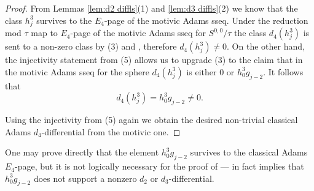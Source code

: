 \begin{proof}
  From Lemmas \ref{lem:d2 diffls}(1) and \ref{lem:d3 diffls}(2) we know that the class $h_j^3$ survives to the $E_4$-page of the motivic Adams sseq.
  Under the reduction mod $\tau$ map to $E_4$-page of the motivic Adams sseq for $S^{0,0}/\tau$
  the class $d_4(h_j^3)$ is sent to a non-zero class by (3) and , therefore $d_4(h_j^3) \neq 0$.
  On the other hand, the injectivity statement from (5) allows us to upgrade
  (3) to the claim that
  in the motivic Adams sseq for the sphere $d_4(h_j^3)$ is either $0$ or $h_0^3g_{j-2}$.
  It follows that
  \[ d_4(h_j^3) = h_0^3g_{j-2} \neq 0. \]
  
  Using the injectivity from (5) again we obtain the desired non-trivial classical Adams $d_4$-differential from the motivic one.
  \qedhere
  

\end{proof}

\begin{rmk}
One may prove directly that the element $h_0^3g_{j-2}$ survives to the classical Adams $E_4$-page, but it is not logically necessary for the proof of --- in fact implies that $h_0^3g_{j-2}$ does not support a nonzero $d_2$ or $d_3$-differential. %
\end{rmk}



